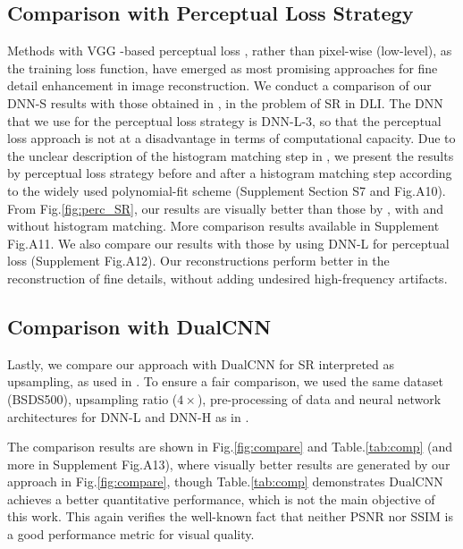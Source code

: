 \documentclass[10pt,twocolumn,letterpaper]{article}
\begin{document}
\subsection{Comparison with Perceptual Loss Strategy}
Methods with VGG \cite{simonyan2014very}-based perceptual loss \cite{johnson2016perceptual,ledig2017photo}, rather than pixel-wise (low-level), as the training loss function, have emerged as most promising approaches for fine detail enhancement in image reconstruction. We conduct a comparison of our DNN-S results with those obtained in \cite{johnson2016perceptual}, in the problem of SR in DLI. The DNN that we use for the perceptual loss strategy is DNN-L-3, so that the perceptual loss approach is not at a disadvantage in terms of  computational capacity. Due to the unclear description of the histogram matching step in \cite{johnson2016perceptual}, we present the results by perceptual loss strategy before and after a histogram matching step according to the widely used polynomial-fit scheme (Supplement Section S7 and Fig.A10). From Fig.\ref{fig:perc_SR}, our results are visually better than those by \cite{johnson2016perceptual}, with and without histogram matching. More comparison results available in Supplement Fig.A11. We also compare our results with those by using DNN-L for perceptual loss (Supplement Fig.A12). Our reconstructions perform better in the reconstruction of fine details, without adding undesired high-frequency artifacts.

\subsection{Comparison with DualCNN}
Lastly, we compare our approach with DualCNN \cite{Pan_2018_CVPR} for SR interpreted as upsampling, as used in \cite{Pan_2018_CVPR}. To ensure a fair comparison, we used the same dataset (BSDS500), upsampling ratio ($4\times$), pre-processing of data and neural network architectures for DNN-L and DNN-H as in \cite{Pan_2018_CVPR}. 

The comparison results are shown in Fig.\ref{fig:compare} and Table.\ref{tab:comp} (and more in Supplement Fig.A13), where visually better results are generated by our approach in Fig.\ref{fig:compare}, though Table.\ref{tab:comp} demonstrates DualCNN achieves a better quantitative performance, which is not the main objective of this work. This again verifies the well-known fact that neither PSNR nor SSIM is a good performance metric for visual quality\cite{gupta2011modified,wang2004image,wang2003multiscale,johnson2016perceptual,ledig2017photo}.   
\end{document}
